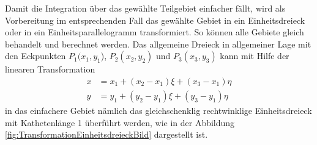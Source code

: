 Damit die Integration über das gewählte Teilgebiet einfacher fällt, wird als Vorbereitung im entsprechenden Fall das gewählte Gebiet in ein Einheitsdreieck oder in ein Einheitsparallelogramm transformiert. So können alle Gebiete gleich behandelt und berechnet werden.
Das allgemeine Dreieck in allgemeiner Lage mit den Eckpunkten $P_1(x_1, y_1$), $ P_2(x_2, y_2)$ und $P_3(x_3,y_3)$ kann mit Hilfe der linearen Transformation
\begin{equation}
	\begin{split}
		x &= x_1 + (x_2 - x_1)\xi + (x_3 - x_1)\eta \\
		y &= y_1 + (y_2 - y_1)\xi + (y_3 - y_1)\eta
		\label{fem:linTransformation}
	\end{split}
\end{equation}
in das einfachere Gebiet nämlich das gleichschenklig rechtwinklige Einheitsdreieck mit Kathetenlänge 1 überführt werden, wie in der Abbildung \ref{fig:TransformationEinheitsdreieckBild} dargestellt ist.

